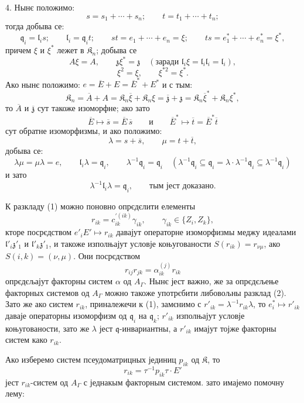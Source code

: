 \documentclass[11pt]{article}
\begin{document}
4. Нынє положимо:
\[
s=s_1+\cdots+s_n;\qquad t=t_1+\cdots+t_n;
\]
тогда добыва се:
\[
\mathfrak q_i=\mathfrak l_is;\qquad
\mathfrak l_i=\mathfrak q_it;\qquad
st=e_1+\cdots+e_n=\xi;\qquad
ts=e_1^*+\cdots+e_n^*=\xi^*,
\]
причем \(\xi\) и \(\xi^*\) лежет в \(\mathfrak K_n\); добыва се
\[
A\xi=A,\qquad \mathfrak z\xi^*=\mathfrak z\quad
(\text{заради }\mathfrak l_i\xi=\mathfrak l_i\mathfrak l_i=\mathfrak l_i),
\]
\[
\xi^2=\xi,\qquad \xi^{*2}=\xi^*.
\]
Ако нынє положимо: \(e=\overline E+E=\overline E^*+E^*\) и с тым:
\[
\mathfrak K_n=\overline A+A
=\mathfrak K_n\overline\xi+\mathfrak K_n\xi
=\overline{\mathfrak z}+\mathfrak z
=\mathfrak K_n\overline\xi^*+\mathfrak K_n\xi^*,
\]
то \(\overline A\) и \(\overline{\mathfrak z}\) сут такоже изоморфне; ако зато
\[
\overline E\mapsto\overline s=\overline E\,\overline s
\qquad\text{и}\qquad
\overline E^*\mapsto\overline t=\overline E^*\overline t
\]
сут обратне изоморфизмы, и ако положимо:
\[
\lambda=s+\overline s,\qquad \mu=t+\overline t,
\]
добыва се:
\[
\lambda\mu=\mu\lambda=e,\qquad
\mathfrak l_i\lambda=\mathfrak q_i,\qquad
\lambda^{-1}\mathfrak q_i=\mathfrak q_i
\quad
(\lambda^{-1}\mathfrak q_i\subseteq\mathfrak q_i
=\lambda\cdot\lambda^{-1}\mathfrak q_i\subseteq\lambda^{-1}\mathfrak q_i)
\]
и зато
\[
\lambda^{-1}\mathfrak l_i\lambda=\mathfrak q_i,\qquad \text{тым јест доказано.}
\]

К разкладу (1) можно поновно опрєдєлити елементы
\[
r_{ik}=c_{ik}^{\prime(ik)}\gamma_{ik},\qquad \gamma_{ik}\in\{Z_i,Z_k\},
\]
кторе посрєдством \(e'_iE'\mapsto r_{ik}\) давајут операторне изоморфизмы меджу идеалами \(\mathfrak l'_i\mathfrak z'_1\) и \(\mathfrak l'_k\mathfrak z'_1\), и такоже изполњајут условје коњугованости \(S(r_{ik})=r_{\nu\mu}\), ако \(S(i,k)=(\nu,\mu)\). Они посрєдством
\[
r_{ij}r_{jk}=\alpha_{ik}^{(j)}r_{ik}
\]
опрєдєљајут факторны систем \(\alpha\) од \(A_\Gamma\). Нынє јест важно, же за опрєдєљење факторных системов од \(A_\Gamma\) можно такоже употрєбити либовољны разклад (2). Зато же ако систем \(r_{ik}\), приналежечи к (1), замєнимо с \(r'_{ik}=\lambda^{-1}r_{ik}\lambda\), то \(e_i^*\mapsto r'_{ik}\) даваје операторны изоморфизм од \(\mathfrak q_i\) на \(\mathfrak q_k\); \(r'_{ik}\) изполњајут условје коњугованости, зато же \(\lambda\) јест \(\mathfrak q\)-инвариантны, а \(r'_{ik}\) имајут тојже факторны систем како \(r_{ik}\).

Ако изберемо систем псеудоматрицных јединиц \(p_{ik}\) од \(\mathfrak K\), то
\[
r_{ik}=\tau^{-1}p_{ik}\tau\cdot E'
\]
јест \(r_{ik}\)-систем од \(A_\Gamma\) с једнакым факторным системом. зато имајемо помочну лему:
\end{document}
